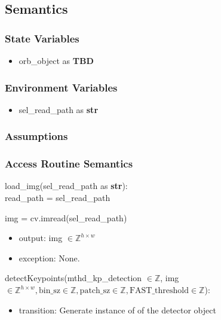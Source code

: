 \documentclass[12pt, titlepage]{article}
\begin{document}
\subsection{Semantics}

\subsubsection{State Variables}
\begin{itemize}
  \item orb\_object as \textbf{TBD}
\end{itemize}

\subsubsection{Environment Variables}
\begin{itemize}
  \item sel\_read\_path as \textbf{str}
\end{itemize}

\subsubsection{Assumptions}


\subsubsection{Access Routine Semantics}

\noindent load\_img(sel\_read\_path as \textbf{str}):\\
read\_path = sel\_read\_path

img = cv.imread(sel\_read\_path)

\begin{itemize}
\item output: img $\in \mathbb{Z}^{h \times w}$
\item exception: None.
\end{itemize}

\noindent detectKeypoints(mthd\_kp\_detection $\in \mathbb{Z}$, 
img $\in \mathbb{Z}^{h \times w}, \text{bin\_sz}\in \mathbb{Z}, \text{patch\_sz}\in 
\mathbb{Z}, \text{FAST\_threshold} \in \mathbb{Z}$):

\begin{itemize}
  \item transition: Generate instance of of the detector object
\end{itemize}
\end{document}
